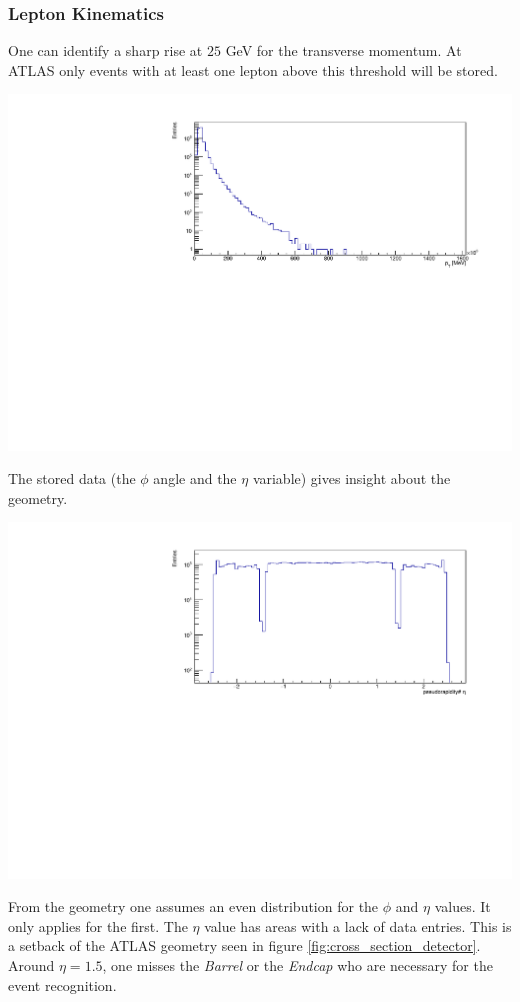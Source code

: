 \documentclass[12pt, a4paper, bibliography=totoc]{scrartcl}
\begin{document}
\begin{multicols}{2}
\subsubsection{Lepton Kinematics}
One can identify a sharp rise at $25$ \si{GeV} for the transverse momentum. 
At ATLAS only events with at least one lepton above this threshold will be stored.
\begin{center}
    \includegraphics[width=0.8\linewidth]{fig/p_T_final.pdf}
\end{center}    
The stored data (the $\phi$ angle and the $\eta$ variable) gives insight about the geometry.
\begin{center}
    \includegraphics[width=0.8\linewidth]{fig/eta_final.pdf}
\end{center}
From the geometry one assumes an even distribution for the $\phi$ and $\eta$ values.
It only applies for the first. 
The $\eta$ value has areas with a lack of data entries. 
This is a setback of the ATLAS geometry seen in figure \ref{fig:cross_section_detector}. 
Around $\eta = 1.5$, one misses the \textit{Barrel} or the \textit{Endcap} who are necessary for the event recognition. 


\end{multicols}
\end{document}
